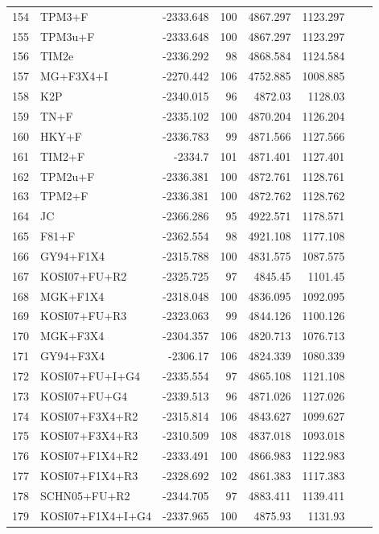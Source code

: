 \documentclass[fleqn,letterpaper]{article}
\begin{document}
\begin{longtable}{clrrrrrr}
	154 & TPM3+F & -2333.648 & 100 & 4867.297 & 1123.297 \\ 
	155 & TPM3u+F & -2333.648 & 100 & 4867.297 & 1123.297 \\ 
	156 & TIM2e & -2336.292 & 98 & 4868.584 & 1124.584 \\ 
	157 & MG+F3X4+I & -2270.442 & 106 & 4752.885 & 1008.885 \\ 
	158 & K2P & -2340.015 & 96 & 4872.03 & 1128.03 \\ 
	159 & TN+F & -2335.102 & 100 & 4870.204 & 1126.204 \\ 
	160 & HKY+F & -2336.783 & 99 & 4871.566 & 1127.566 \\ 
	161 & TIM2+F & -2334.7 & 101 & 4871.401 & 1127.401 \\ 
	162 & TPM2u+F & -2336.381 & 100 & 4872.761 & 1128.761 \\ 
	163 & TPM2+F & -2336.381 & 100 & 4872.762 & 1128.762 \\ 
	164 & JC & -2366.286 & 95 & 4922.571 & 1178.571 \\ 
	165 & F81+F & -2362.554 & 98 & 4921.108 & 1177.108 \\ 
	166 & GY94+F1X4 & -2315.788 & 100 & 4831.575 & 1087.575 \\ 
	167 & KOSI07+FU+R2 & -2325.725 & 97 & 4845.45 & 1101.45 \\ 
	168 & MGK+F1X4 & -2318.048 & 100 & 4836.095 & 1092.095 \\ 
	169 & KOSI07+FU+R3 & -2323.063 & 99 & 4844.126 & 1100.126 \\ 
	170 & MGK+F3X4 & -2304.357 & 106 & 4820.713 & 1076.713 \\ 
	171 & GY94+F3X4 & -2306.17 & 106 & 4824.339 & 1080.339 \\ 
	172 & KOSI07+FU+I+G4 & -2335.554 & 97 & 4865.108 & 1121.108 \\ 
	173 & KOSI07+FU+G4 & -2339.513 & 96 & 4871.026 & 1127.026 \\ 
	174 & KOSI07+F3X4+R2 & -2315.814 & 106 & 4843.627 & 1099.627 \\ 
	175 & KOSI07+F3X4+R3 & -2310.509 & 108 & 4837.018 & 1093.018 \\ 
	176 & KOSI07+F1X4+R2 & -2333.491 & 100 & 4866.983 & 1122.983 \\ 
	177 & KOSI07+F1X4+R3 & -2328.692 & 102 & 4861.383 & 1117.383 \\ 
	178 & SCHN05+FU+R2 & -2344.705 & 97 & 4883.411 & 1139.411 \\ 
	179 & KOSI07+F1X4+I+G4 & -2337.965 & 100 & 4875.93 & 1131.93 \\ 

\end{longtable}
\end{document}
